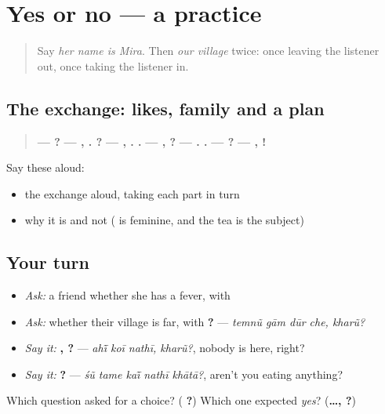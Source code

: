 \section[Practice]{Yes or no — a practice}

\label{lesson:GU-C146-ask-practice}



\begin{quote}
Say \emph{her name is Mira}. Then \emph{our village} twice: once leaving the listener out, once taking the listener in.
\end{quote}

\subsection*{The exchange: likes, family and a plan}
\begin{quote}
\textbf{—     ?} \textbf{— ,    . ?} \textbf{— ,    .    .} \textbf{—     , ?} \textbf{— .    .} \textbf{—     ?} \textbf{— ,  !}
\end{quote}

Say these aloud:

\begin{itemize}
\raggedright
  \item the exchange aloud, taking each part in turn
  \item why it is \textbf{ } and not \textbf{ } (\textbf{} is feminine, and the tea is the subject)
\end{itemize}

\subsection*{Your turn}
\begin{itemize}
\raggedright
  \item \emph{Ask:} a friend whether she has a fever, with \textbf{}
  \item \emph{Ask:} whether their village is far, with \textbf{?} — \emph{temnũ gām dūr che, kharũ?}
  \item \emph{Say it:} \textbf{  , ?} — \emph{ahī̃ koī nathī, kharũ?}, nobody is here, right?
  \item \emph{Say it:} \textbf{    ?} — \emph{śũ tame kaī̃ nathī khātā?}, aren't you eating anything?
\end{itemize}

\begin{tcolorbox}[breakable,colback=teal!4,colframe=teal!35!black,title={Before you move on}]
Which question asked for a choice? (\textbf{    ?}) Which one expected \emph{yes}? (\textbf{…, ?})
\end{tcolorbox}

